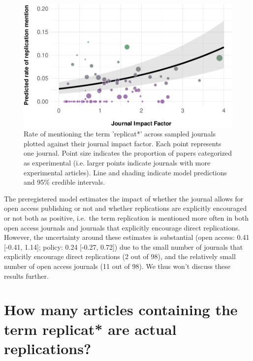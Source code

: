 \documentclass[cm,linguex]{glossa}
\begin{document}
\begin{figure}

{\centering \includegraphics[width=1\linewidth]{ReplicationLingGlossa_files/figure-latex/plot-mention-jif-1} 

}

\caption{Rate of mentioning the term 'replicat*' across sampled journals plotted against their journal impact factor. Each point represents one journal. Point size indicates the proportion of papers categorized as experimental (i.e. larger points indicate journals with more experimental articles). Line and shading indicate model predictions and 95\% credible intervals.}\label{fig:plot-mention-jif}
\end{figure}

The preregistered model estimates the impact of whether the journal allows for open access publishing or not and whether replications are explicitly encouraged or not both as positive, i.e.~the term replication is mentioned more often in both open access journals and journals that explicitly encourage direct replications. However, the uncertainty around these estimates is substantial (open access: 0.41 {[}-0.41, 1.14{]}; policy: 0.24 {[}-0.27, 0.72{]}) due to the small number of journals that explicitly encourage direct replications (2 out of 98), and the relatively small number of open access journals (11 out of 98). We thus won't discuss these results further.

\hypertarget{how-many-articles-containing-the-term-replicat-are-actual-replications}{%
\section{How many articles containing the term replicat* are actual replications?}\label{how-many-articles-containing-the-term-replicat-are-actual-replications}}
\end{document}
